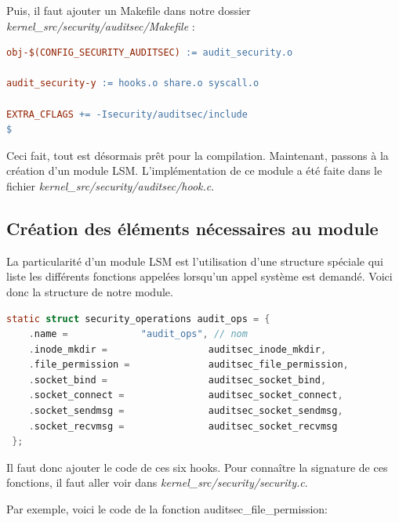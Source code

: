\documentclass[pdftex,a4paper,titlepage,11pt]{article}
\begin{document}
Puis, il faut ajouter un Makefile dans notre dossier \textit{{kernel\_src}/security/auditsec/Makefile} :

\begin{lstlisting}[language=make]
obj-$(CONFIG_SECURITY_AUDITSEC) := audit_security.o
 
audit_security-y := hooks.o share.o syscall.o

EXTRA_CFLAGS += -Isecurity/auditsec/include
$\end{lstlisting}

Ceci fait, tout est désormais prêt pour la compilation. Maintenant, passons à la création d'un module LSM. L'implémentation de ce module a été faite dans le fichier \textit{{kernel\_src}/security/auditsec/hook.c}. 

\subsection{Création des éléments nécessaires au module}

La particularité d'un module LSM est l'utilisation d'une structure spéciale qui liste les différents fonctions appelées lorsqu'un appel système est demandé. Voici donc la structure de notre module.

\begin{lstlisting}[language=C]
static struct security_operations audit_ops = {
	.name =             "audit_ops", // nom 
	.inode_mkdir =                  auditsec_inode_mkdir,
	.file_permission =              auditsec_file_permission,
	.socket_bind =                  auditsec_socket_bind,
	.socket_connect =               auditsec_socket_connect,
	.socket_sendmsg =               auditsec_socket_sendmsg,
 	.socket_recvmsg =               auditsec_socket_recvmsg
 };
\end{lstlisting}

Il faut donc ajouter le code de ces six hooks. Pour connaître la signature de ces fonctions, il faut aller voir dans \textit{{kernel\_src}/security/security.c}. 

Par exemple, voici le code de la fonction auditsec\_file\_permission:
\end{document}
